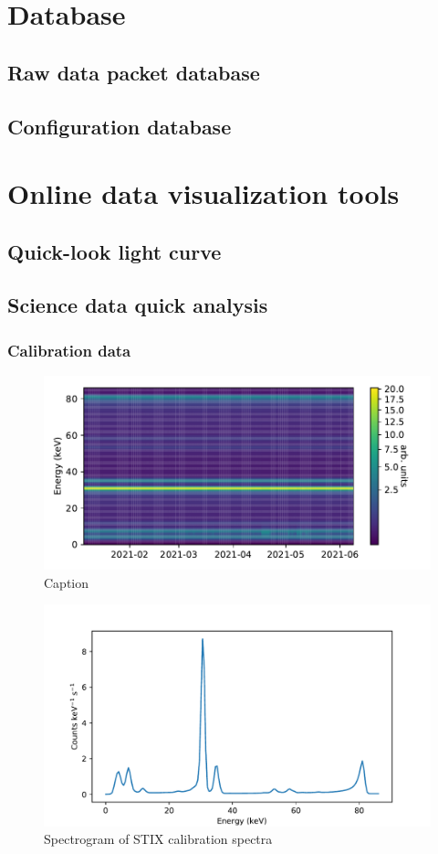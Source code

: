 \documentclass{aa}
\begin{document}
\section{Database}
\subsection{Raw data packet database } 
\subsection{Configuration database}

\section{Online data visualization tools}
\subsection{Quick-look light curve}
\subsection{Science data quick analysis}
\subsubsection{Calibration data}
\begin{figure}
    \centering
    \includegraphics[width=0.8\linewidth]{figures/calibrationSpectrogram.pdf}
    \caption{Caption}
    \label{fig:calibrationSpectrum}
\end{figure}
\begin{figure}
    \centering
    \includegraphics[width=0.8\linewidth]{figures/calibrationSpectrum.pdf}
    \caption{Spectrogram of STIX calibration spectra}
    \label{fig:calibrationSpectrogram}
\end{figure}
\end{document}
